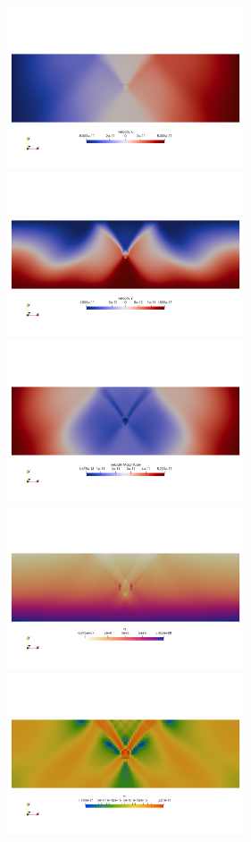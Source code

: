 \begin{center}
\includegraphics[width=7cm]{python_codes/fieldstone_70/u}
\includegraphics[width=7cm]{python_codes/fieldstone_70/v}\\
\includegraphics[width=7cm]{python_codes/fieldstone_70/vel}
\includegraphics[width=7cm]{python_codes/fieldstone_70/q}\\
\includegraphics[width=7cm]{python_codes/fieldstone_70/e}

\end{center}
